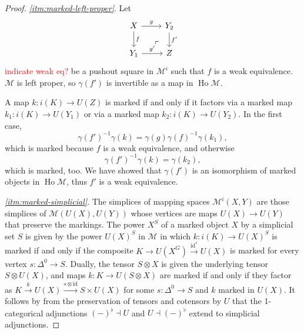 \documentclass{article}
\newcommand{\todo}[1]{\textcolor{red}{#1}}
\theoremstyle{remark}
\theoremstyle{definition}
\begin{document}
\begin{proof}
  \emph{\ref{itm:marked-left-proper}}.
  Let 
  \begin{equation}
    \begin{tikzcd}
      X \arrow[r, "g"] \arrow[d, "f"] \arrow[dr, phantom, near end, "\ulcorner"] & Y_2 \arrow[d, "f'"] \\
      Y_1 \arrow[r, "g'"] & Z
    \end{tikzcd}
  \end{equation}
  \todo{indicate weak eq?}
  be a pushout square in $\mathcal{M}^i$ such that $f$ is a weak equivalence.
  $\mathcal{M}$ is left proper, so $\gamma(f')$ is invertible as a map in $\operatorname{Ho} \mathcal{M}$.

  A map $k : i(K) \rightarrow U(Z)$ is marked if and only if it factors via a marked map $k_1 : i(K) \rightarrow U(Y_1)$ or via a marked map $k_2 : i(K) \rightarrow U(Y_2)$.
  In the first case,
  \begin{equation}
    \gamma(f')^{-1} \gamma(k) = \gamma(g) \gamma(f)^{-1} \gamma(k_1),
  \end{equation}
  which is marked because $f$ is a weak equivalence, and otherwise
  \begin{equation}
    \gamma(f')^{-1} \gamma(k) = \gamma(k_2),
  \end{equation}
  which is marked, too.
  We have showed that $\gamma(f')$ is an isomorphism of marked objects in $\operatorname{Ho} \mathcal{M}$, thus $f'$ is a weak equivalence.

  \emph{\ref{itm:marked-simplicial}}.
  The simplices of mapping spaces $\mathcal{M}^i(X, Y)$ are those simplices of $\mathcal{M}(U(X), U(Y))$ whose vertices are maps $U(X) \rightarrow U(Y)$ that preserve the markings.
  The power $X^S$ of a marked object $X$ by a simplicial set $S$ is given by the power $U(X)^S$ in $\mathcal{M}$ in which $k : i(K) \rightarrow U(X)^S$ is marked if and only if the composite $K \rightarrow U(X^G) \xrightarrow{\mathrm{id}^s} U(X)$ is marked for every vertex $s : \Delta^0 \rightarrow S$.
  Dually, the tensor $S \otimes X$ is given the underlying tensor $S \otimes U(X)$, and maps $k : K \rightarrow U(S \otimes X)$ are marked if and only if they factor as $K \xrightarrow{k} U(X) \xrightarrow{s \otimes \mathrm{id}} S \times U(X)$ for some $s : \Delta^0 \rightarrow S$ and $k$ marked in $U(X)$.
  It follows by \cite[Theorem 4.85]{basic-concepts-of-enriched-category-theory} from the preservation of tensors and cotensors by $U$ that the 1-categorical adjunctions $(-)^\flat \dashv U$ and $U \dashv (-)^\flat$ extend to simplicial adjunctions.


\end{proof}
\end{document}
